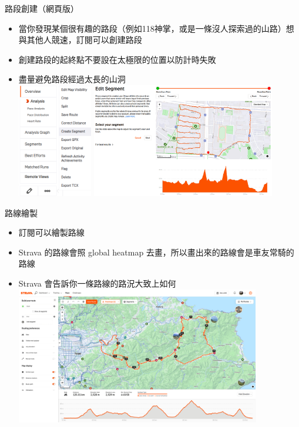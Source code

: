 \begin{frame}{路段創建（網頁版）}
\begin{itemize}
\item 當你發現某個很有趣的路段（例如118神掌，或是一條沒人探索過的山路）想與其他人競速，訂閱可以創建路段\pause
\item 創建路段的起終點不要設在太極限的位置以防計時失敗\pause
\item 盡量避免路段經過太長的山洞\\\pause
\includegraphics[height=5cm]{segmentCreate1.png}\pause
\includegraphics[height=5cm]{segmentCreate2.png}
\end{itemize}
\end{frame}

\begin{frame}{路線繪製}
\begin{itemize}
\item 訂閱可以繪製路線\pause
\item Strava 的路線會照 global heatmap 去畫，所以畫出來的路線會是車友常騎的路線\pause
\item Strava 會告訴你一條路線的路況大致上如何\\\pause
\includegraphics[height=6cm]{routeCreate.png}
\end{itemize}
\end{frame}
